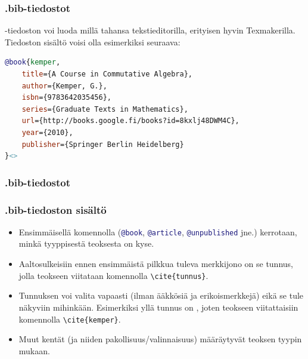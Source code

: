 \begin{frame}[fragile]
    \frametitle{.bib-tiedostot}
    -tiedoston voi luoda millä tahansa tekstieditorilla, erityisen hyvin Texmakerilla. 
    \vaihto
    Tiedoston sisältö voisi olla esimerkiksi seuraava:\vaihto
    \begin{lstlisting}[language=BibTeX,basicstyle=\ttfamily\small]
@book{kemper,
    title={A Course in Commutative Algebra},
    author={Kemper, G.},
    isbn={9783642035456},
    series={Graduate Texts in Mathematics},
    url={http://books.google.fi/books?id=8kxlj48DWM4C},
    year={2010},
    publisher={Springer Berlin Heidelberg}
}<>
    \end{lstlisting}
\end{frame}

\begin{frame}[fragile]
    \frametitle{.bib-tiedostot}
    
\end{frame}

\begin{frame}[fragile]
    \frametitle{.bib-tiedoston sisältö}
    \begin{itemize}
        \item Ensimmäisellä komennolla (\lstinline[language=BibTeX]-@book-, \lstinline[language=BibTeX]-@article-, \lstinline[language=BibTeX]-@unpublished- jne.) kerrotaan, minkä tyyppisestä teoksesta on kyse. 
        \item Aaltosulkeisiin ennen ensimmäistä pilkkua tuleva merkkijono on se tunnus, jolla teokseen viitataan komennolla \lstinline-\cite{tunnus}-. 
        \item Tunnuksen voi valita vapaasti (ilman ääkkösiä ja erikoismerkkejä) eikä se tule näkyviin mihinkään.  Esimerkiksi yllä tunnus on , joten teokseen viitattaisiin komennolla \lstinline-\cite{kemper}-.
        \item Muut kentät (ja niiden pakollisuus/valinnaisuus) määräytyvät teoksen tyypin mukaan.
    \end{itemize}
\end{frame}

